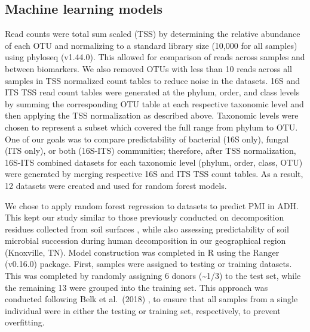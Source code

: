 \documentclass[
  10pt,
  letterpaper,
]{article}
\begin{document}
\subsection{Machine learning models}\label{machine-learning-models}

Read counts were total sum scaled (TSS) by determining the relative
abundance of each OTU and normalizing to a standard library size (10,000
for all samples) using phyloseq \citep{mcmurdie_phyloseq_2013}
(v1.44.0). This allowed for comparison of reads across samples and
between biomarkers. We also removed OTUs with less than 10 reads across
all samples in TSS normalized count tables to reduce noise in the
datasets. 16S and ITS TSS read count tables were generated at the
phylum, order, and class levels by summing the corresponding OTU table
at each respective taxonomic level and then applying the TSS
normalization as described above. Taxonomic levels were chosen to
represent a subset which covered the full range from phylum to OTU. One
of our goals was to compare predictability of bacterial (16S only),
fungal (ITS only), or both (16S-ITS) communities; therefore, after TSS
normalization, 16S-ITS combined datasets for each taxonomic level
(phylum, order, class, OTU) were generated by merging respective 16S and
ITS TSS count tables. As a result, 12 datasets were created and used for
random forest models.

We chose to apply random forest regression to datasets to predict PMI in
ADH. This kept our study similar to those previously conducted on
decomposition residues collected from soil surfaces
\citep{belk_microbiome_2018, burcham_conserved_2024}, while also
assessing predictability of soil microbial succession during human
decomposition in our geographical region (Knoxville, TN). Model
construction was completed in R using the Ranger
\citep{wright_ranger_2017} (v0.16.0) package. First, samples were
assigned to testing or training datasets. This was completed by randomly
assigning 6 donors (\textasciitilde1/3) to the test set, while the
remaining 13 were grouped into the training set. This approach was
conducted following Belk et al.~(2018) \citep{belk_microbiome_2018}, to
ensure that all samples from a single individual were in either the
testing or training set, respectively, to prevent overfitting.
\end{document}

